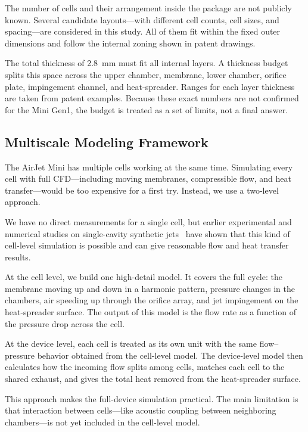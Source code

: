 \documentclass[11pt]{article}
\begin{document}
The number of cells and their arrangement inside the package are not
publicly known. Several candidate layouts---with different cell counts,
cell sizes, and spacing---are considered in this study. All of them fit
within the fixed outer dimensions and follow the internal zoning shown
in patent drawings.

The total thickness of 2.8~mm must fit all internal layers. A thickness
budget splits this space across the upper chamber, membrane, lower
chamber, orifice plate, impingement channel, and heat-spreader. Ranges
for each layer thickness are taken from patent examples. Because these
exact numbers are not confirmed for the Mini Gen1, the budget is treated
as a set of limits, not a final answer.

\subsection{Multiscale Modeling Framework}

The AirJet Mini has multiple cells working at the same time. Simulating
every cell with full CFD---including moving membranes, compressible
flow, and heat transfer---would be too expensive for a first try.
Instead, we use a two-level approach.

We have no direct measurements for a single cell, but earlier
experimental and numerical studies on single-cavity synthetic jets~\cite{singh2022experimental,krishan2019synthetic}
have shown that this kind of cell-level simulation is possible and can
give reasonable flow and heat transfer results.

At the cell level, we build one high-detail model. It covers the full
cycle: the membrane moving up and down in a harmonic pattern, pressure
changes in the chambers, air speeding up through the orifice array, and
jet impingement on the heat-spreader surface. The output of this model
is the flow rate as a function of the pressure drop across the cell.

At the device level, each cell is treated as its own unit with the same
flow--pressure behavior obtained from the cell-level model. The
device-level model then calculates how the incoming flow splits among
cells, matches each cell to the shared exhaust, and gives the total
heat removed from the heat-spreader surface.

This approach makes the full-device simulation practical. The main
limitation is that interaction between cells---like acoustic coupling
between neighboring chambers---is not yet included in the cell-level
model.
\end{document}
